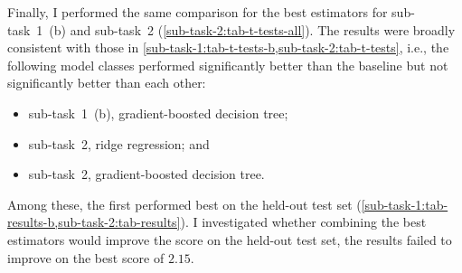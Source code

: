 Finally, I performed the same comparison for the best estimators for sub-task~1~(b) and
sub-task~2 (\cref{sub-task-2:tab-t-tests-all}).
The results were broadly consistent with those in
\cref{sub-task-1:tab-t-tests-b,sub-task-2:tab-t-tests}, i.e., the following model classes
performed significantly better than the baseline but not significantly better than
each other:
\begin{itemize}
  \item sub-task~1~(b), gradient-boosted decision tree;
  \item sub-task~2, ridge regression; and
  \item sub-task~2, gradient-boosted decision tree.
\end{itemize}
Among these, the first performed best on the held-out test set
(\cref{sub-task-1:tab-results-b,sub-task-2:tab-results}).
I investigated whether combining the best estimators would improve the score on the
held-out test set, the results failed to improve on the best score of $2.15$.
